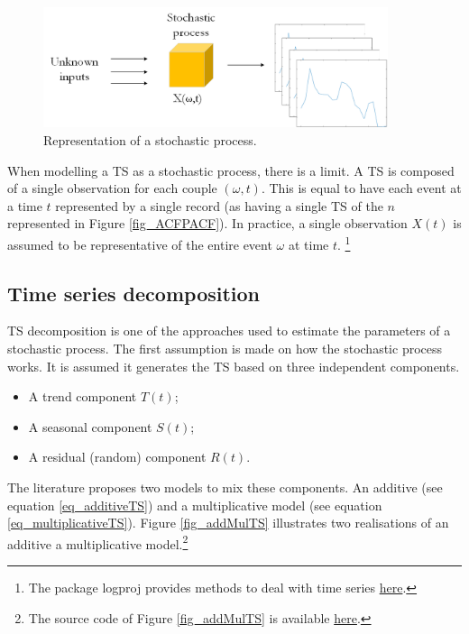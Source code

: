 \begin{figure}[hbt!]
\centering
\includegraphics[width=0.9\textwidth]{SectionLetsMath/elemStat_figures/fig_stochProcess.png}
\captionsetup{type=figure}
\caption{Representation of a stochastic process.}
\label{fig_stochProcess}
\end{figure}


When modelling a TS as a stochastic process, there is a limit. A TS is composed of a single observation for each couple $(\omega,t)$. This is equal to have each event at a time $t$ represented by a single record (as having a single TS of the $n$ represented in Figure \ref{fig_ACFPACF}). In practice, a single observation $X(t)$ is assumed to be representative of the entire event $\omega$ at time $t$. \footnote{The package logproj provides methods to deal with time series \href{https://github.com/aletuf93/logproj/blob/master/logproj/stat_time_series.py}{here}.
}

\subsection{Time series decomposition} \label{secTimeSeriesDecomposition}
TS decomposition is one of the approaches used to estimate the parameters of a stochastic process. The first assumption is made on how the stochastic process works. It is assumed it generates the TS based on three independent components.
\begin{itemize}
    \item A trend component $T(t)$;
    \item A seasonal component $S(t)$;
    \item A residual (random) component $R(t)$.
\end{itemize}

The literature proposes two models to mix these components. An additive (see equation \ref{eq_additiveTS}) and a multiplicative model (see equation \ref{eq_multiplicativeTS}). Figure \ref{fig_addMulTS} illustrates two realisations of an additive a multiplicative model.\footnote{The source code of Figure \ref{fig_addMulTS} is available \href{https://github.com/aletuf93/logproj/blob/master/examples/03.\%20Statistics.ipynb}{here}.}

